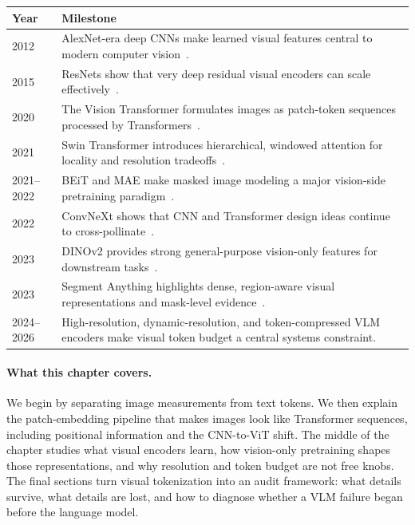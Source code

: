 \begin{center}
\begin{tabularx}{\textwidth}{@{}lX@{}}
\toprule
\textbf{Year} & \textbf{Milestone} \\
\midrule
2012 & AlexNet-era deep CNNs make learned visual features central to modern computer vision~\cite{krizhevsky2012imagenet}. \\
2015 & ResNets show that very deep residual visual encoders can scale effectively~\cite{he2016deep}. \\
2020 & The Vision Transformer formulates images as patch-token sequences processed by Transformers~\cite{dosovitskiy2020image}. \\
2021 & Swin Transformer introduces hierarchical, windowed attention for locality and resolution tradeoffs~\cite{liu2021swin}. \\
2021--2022 & BEiT and MAE make masked image modeling a major vision-side pretraining paradigm~\cite{bao2021beit,he2022masked}. \\
2022 & ConvNeXt shows that CNN and Transformer design ideas continue to cross-pollinate~\cite{liu2022convnet}. \\
2023 & DINOv2 provides strong general-purpose vision-only features for downstream tasks~\cite{oquab2023dinov2}. \\
2023 & Segment Anything highlights dense, region-aware visual representations and mask-level evidence~\cite{kirillov2023segment}. \\
2024--2026 & High-resolution, dynamic-resolution, and token-compressed VLM encoders make visual token budget a central systems constraint. \\
\bottomrule
\end{tabularx}
\end{center}

\paragraph{What this chapter covers.} We begin by separating image measurements from text tokens. We then explain the patch-embedding pipeline that makes images look like Transformer sequences, including positional information and the CNN-to-ViT shift. The middle of the chapter studies what visual encoders learn, how vision-only pretraining shapes those representations, and why resolution and token budget are not free knobs. The final sections turn visual tokenization into an audit framework: what details survive, what details are lost, and how to diagnose whether a VLM failure began before the language model.


